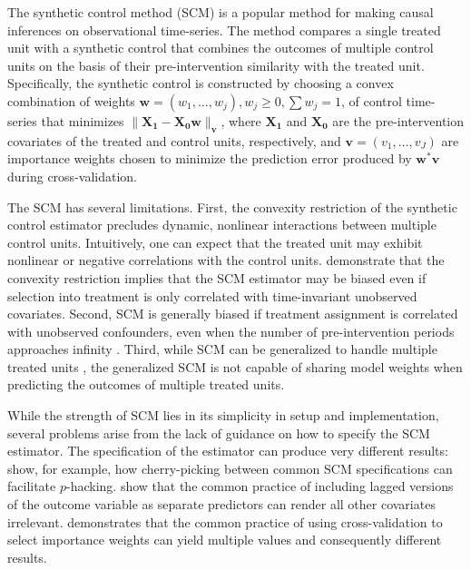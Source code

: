 \documentclass[hidelinks,12pt]{article}
\begin{document}
The synthetic control method (SCM) \citep{abadie2010synthetic} is a popular method for making causal inferences on observational time-series. The method compares a single treated unit with a synthetic control that combines the outcomes of multiple control units on the basis of their pre-intervention similarity with the treated unit. Specifically, the synthetic control is constructed by choosing a convex combination of weights $\mathbf{w} = (w_1, \ldots, w_j), w_j \geq 0, \sum w_j =1$, of control time-series that minimizes $\|\mathbf{X_1} - \mathbf{X_0} \mathbf{w}\|_\mathbf{v}$, where $\mathbf{X_1}$ and $\mathbf{X_0}$ are the pre-intervention covariates of the treated and control units, respectively, and $\mathbf{v}= (v_1, \ldots, v_J)$ are importance weights chosen to minimize the prediction error produced by $\mathbf{w}^{*} \mathbf{v}$ during cross-validation. 

The SCM has several limitations. First, the convexity restriction of the synthetic control estimator precludes dynamic, nonlinear interactions between multiple control units. Intuitively, one can expect that the treated unit may exhibit nonlinear or negative correlations with the control units. \citet{ferman2016revisiting} demonstrate that the convexity restriction implies that the SCM estimator may be biased even if selection into treatment is only correlated with time-invariant unobserved covariates. Second, SCM is generally biased if treatment assignment is correlated with unobserved confounders, even when the number of pre-intervention periods approaches infinity \citep{ferman2018synthetic}. Third, while SCM can be generalized to handle multiple treated units \citep[e.g.,][]{dube2015pooling,xu2017generalized}, the generalized SCM is not capable of sharing model weights when predicting the outcomes of multiple treated units. 

While the strength of SCM lies in its simplicity in setup and implementation, several problems arise from the lack of guidance on how to specify the SCM estimator. The specification of the estimator can produce very different results: \citet{ferman2018cherry} show, for example, how cherry-picking between common SCM specifications can facilitate $p$-hacking.\citet{kaul2015synthetic} show that the common practice of including lagged versions of the outcome variable as separate predictors can render all other covariates irrelevant. \citet{klossner2017comparative} demonstrates that the common practice of using cross-validation to select importance weights can yield multiple values and consequently different results. 
\end{document}

